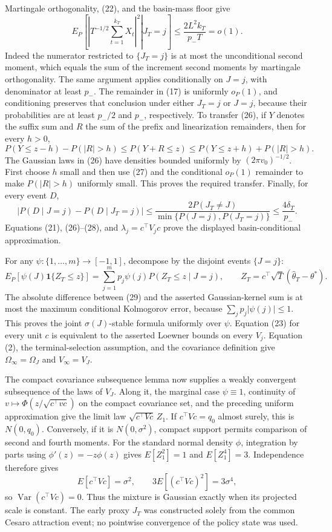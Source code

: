 Martingale orthogonality, (22), and the basin-mass floor give
\[
 E_P\!\left[\left.\left|T^{-1/2}\sum_{t=1}^{k_T}X_t\right|^2\right|J_T=j\right]
 \le \frac{2L^2k_T}{p_-T}=o(1).
\tag{27}
\]
Indeed the numerator restricted to \(\{J_T=j\}\) is at most the unconditional second moment, which equals the sum of the increment second moments by martingale orthogonality. The same argument applies conditionally on \(J=j\), with denominator at least \(p_-\). The remainder in (17) is uniformly \(o_P(1)\), and conditioning preserves that conclusion under either \(J_T=j\) or \(J=j\), because their probabilities are at least \(p_-/2\) and \(p_-\), respectively. To transfer (26), if \(Y\) denotes the suffix sum and \(R\) the sum of the prefix and linearization remainders, then for every \(h>0\),
\[
 P(Y\le z-h)-P(|R|>h)\le P(Y+R\le z)
 \le P(Y\le z+h)+P(|R|>h).
\]
The Gaussian laws in (26) have densities bounded uniformly by \((2\pi v_0)^{-1/2}\). First choose \(h\) small and then use (27) and the conditional \(o_P(1)\) remainder to make \(P(|R|>h)\) uniformly small. This proves the required transfer. Finally, for every event \(D\),
\[
 \left|P(D\mid J=j)-P(D\mid J_T=j)\right|
 \le \frac{2P(J_T\ne J)}{\min\{P(J=j),P(J_T=j)\}}
 \le\frac{4\delta_T}{p_-}.
\tag{28}
\]
Equations (21), (26)--(28), and \(\lambda_j=c^\top V_jc\) prove the displayed basin-conditional approximation.

For any \(\psi:\{1,\ldots,m\}\to[-1,1]\), decompose by the disjoint events \(\{J=j\}\):
\[
 E_P[\psi(J)\mathbf1\{Z_T\le z\}]
 =\sum_{j=1}^mp_j\psi(j)P(Z_T\le z\mid J=j),
 \qquad Z_T=c^\top\sqrt T(\widehat\theta_T-\theta^*).
\tag{29}
\]
The absolute difference between (29) and the asserted Gaussian-kernel sum is at most the maximum conditional Kolmogorov error, because \(\sum_jp_j|\psi(j)|\le1\). This proves the joint \(\sigma(J)\)-stable formula uniformly over \(\psi\). Equation (23) for every unit \(c\) is equivalent to the asserted Loewner bounds on every \(V_j\). Equation (2), the terminal-selection assumption, and the covariance definition give \(\Omega_\infty=\Omega_J\) and \(V_\infty=V_J\).

The compact covariance subsequence lemma now supplies a weakly convergent subsequence of the laws of \(V_J\). Along it, the marginal case \(\psi\equiv1\), continuity of \(v\mapsto\Phi(z/\sqrt{c^\top vc})\) on the compact covariance set, and the preceding uniform approximation give the limit law \(\sqrt{c^\top Vc}\,Z_1\). If \(c^\top Vc=q_0\) almost surely, this is \(N(0,q_0)\). Conversely, if it is \(N(0,\sigma^2)\), compact support permits comparison of second and fourth moments. For the standard normal density \(\phi\), integration by parts using \(\phi'(z)=-z\phi(z)\) gives \(E[Z_1^2]=1\) and \(E[Z_1^4]=3\). Independence therefore gives
\[
 E[c^\top Vc]=\sigma^2,
 \qquad 3E[(c^\top Vc)^2]=3\sigma^4,
\]
so \(\operatorname{Var}(c^\top Vc)=0\). Thus the mixture is Gaussian exactly when its projected scale is constant. The early proxy \(J_T\) was constructed solely from the common Cesaro attraction event; no pointwise convergence of the policy state was used.